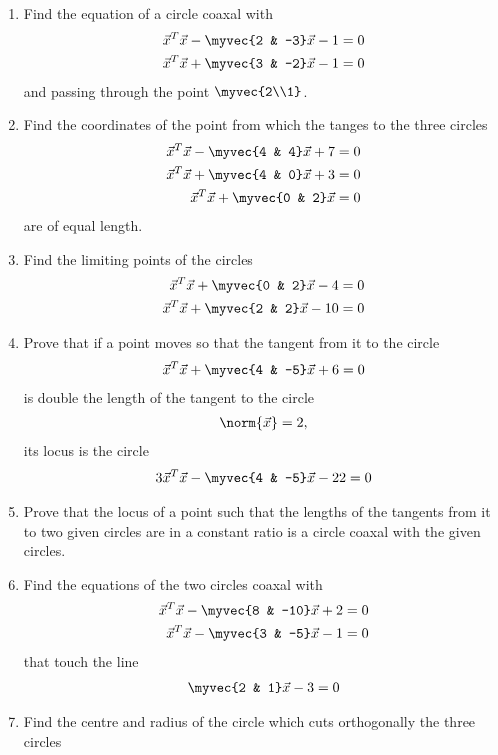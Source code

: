 \begin{enumerate}[label=\arabic*.,ref=\thesubsection.\theenumi]
\solution

\item Find the equation of a circle coaxal with
\begin{align}
\vec{x}^T\vec{x}-\myvec{2 & -3}\vec{x}-1 &= 0
\\
\vec{x}^T\vec{x}+\myvec{3 & -2}\vec{x}-1 &= 0
\end{align}
and passing through the point $\myvec{2\\1}$.
\item Find the coordinates of the point from which the tanges to the three circles
\begin{align}
\vec{x}^T\vec{x}-\myvec{4 & 4}\vec{x}+7 = 0
\\
\vec{x}^T\vec{x}+\myvec{4 & 0}\vec{x}+3 = 0
\\
\vec{x}^T\vec{x}+\myvec{0 & 2}\vec{x} = 0
\end{align}
are of equal length.
\item Find the limiting points of the circles
\begin{align}
\vec{x}^T\vec{x}+\myvec{0 & 2}\vec{x}-4 &= 0
\\
\vec{x}^T\vec{x}+\myvec{2 & 2}\vec{x}-10 &= 0
\end{align}
\item Prove that if a point moves so that the tangent from it to the circle
\begin{align}
\vec{x}^T\vec{x}+\myvec{4 & -5}\vec{x}+6 = 0
\end{align}
is double the length of the tangent to the circle
\begin{align}
\norm{\vec{x}} = 2,
\end{align}
its locus is the circle
\begin{align}
3\vec{x}^T\vec{x}-\myvec{4 & -5}\vec{x}-22 = 0
\end{align}
\item Prove that the locus of a point such that the lengths of the tangents from it to two given circles are in a constant ratio is a circle
coaxal with the given circles.
\item Find the equations of the two circles coaxal with
\begin{align}
\vec{x}^T\vec{x}-\myvec{8 & -10}\vec{x}+2 = 0
\\
\vec{x}^T\vec{x}-\myvec{3 & -5}\vec{x}-1 = 0
\end{align}
that touch the line
\begin{align}
\myvec{2 & 1}\vec{x}-3 = 0
\end{align}
\item Find the centre and radius of the circle which cuts orthogonally the three circles

\end{enumerate}
